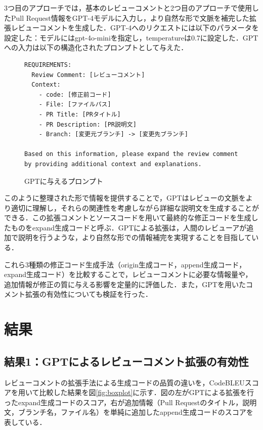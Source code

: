 \documentclass[11pt]{jreport}
\begin{document}
3つ目のアプローチでは，基本のレビューコメントと2つ目のアプローチで使用したPull Request情報をGPT-4モデルに入力し，より自然な形で文脈を補完した拡張レビューコメントを生成した．GPT-4へのリクエストには以下のパラメータを設定した：モデルにはgpt-4o-miniを指定し，temperatureは0.7に設定した．GPTへの入力は以下の構造化されたプロンプトとして与えた．

\begin{figure}[ht]
        \begin{lstlisting}[basicstyle=\ttfamily\small,
                          frame=single,
                          breaklines=true,
                          numbers=none,
                          backgroundcolor=\color{gray!10},
                          captionpos=b]
REQUIREMENTS:
  Review Comment: [レビューコメント]
  Context:
    - code: [修正前コード]
    - File: [ファイルパス]
    - PR Title: [PRタイトル]
    - PR Description: [PR説明文]
    - Branch: [変更元ブランチ] -> [変更先ブランチ]

Based on this information, please expand the review comment by providing additional context and explanations.
        \end{lstlisting}
    \caption{GPTに与えるプロンプト}
    \label{fig:prompt-structure}
\end{figure}

このように整理された形で情報を提供することで，GPTはレビューの文脈をより適切に理解し，それらの関連性を考慮しながら詳細な説明文を生成することができる．この拡張コメントとソースコードを用いて最終的な修正コードを生成したものをexpand生成コードと呼ぶ．GPTによる拡張は，人間のレビューアが追加で説明を行うような，より自然な形での情報補完を実現することを目指している．

これら3種類の修正コード生成手法（origin生成コード，append生成コード，expand生成コード）を比較することで，レビューコメントに必要な情報量や，追加情報が修正の質に与える影響を定量的に評価した．また，GPTを用いたコメント拡張の有効性についても検証を行った．


\section{結果}
\subsection{結果1：GPTによるレビューコメント拡張の有効性}
レビューコメントの拡張手法による生成コードの品質の違いを，CodeBLEUスコアを用いて比較した結果を図\ref{fig:boxplot}に示す．図の左がGPTによる拡張を行ったexpand生成コードのスコア，右が追加情報（Pull Requestのタイトル，説明文，ブランチ名，ファイル名）を単純に追加したappend生成コードのスコアを表している．
\end{document}
